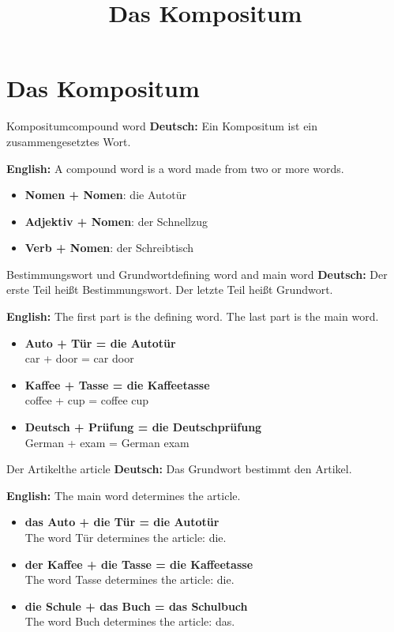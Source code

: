 \documentclass[a4paper,11pt]{article}
\title{Das Kompositum}
\date{}
\newcommand{\GermanText}[1]{\textbf{Deutsch: }#1\par}
\newcommand{\EnglishText}[1]{{\small\color{SoftGray}\textbf{English: }#1\par}}
\newcommand{\ExampleItem}[2]{\item \textbf{#1}\\{\small\color{SoftGray}#2}}
\begin{document}
    \maketitle
    \tableofcontents
    \newpage
    
    
    \section{Das Kompositum}
        
        \begin{grammarentry}{Kompositum}{compound word}
            \GermanText{Ein Kompositum ist ein zusammengesetztes Wort.}
            \EnglishText{A compound word is a word made from two or more words.}
            
            \begin{itemize}
                \item \textbf{Nomen + Nomen}: die Autotür
                \item \textbf{Adjektiv + Nomen}: der Schnellzug
                \item \textbf{Verb + Nomen}: der Schreibtisch
            \end{itemize}
        \end{grammarentry}
        
        \begin{grammarentry}{Bestimmungswort und Grundwort}{defining word and main word}
            \GermanText{Der erste Teil heißt Bestimmungswort. Der letzte Teil heißt Grundwort.}
            \EnglishText{The first part is the defining word. The last part is the main word.}
            
            \begin{exbox}
                \begin{itemize}
                    \ExampleItem{Auto + Tür = die Autotür}{car + door = car door}
                    \ExampleItem{Kaffee + Tasse = die Kaffeetasse}{coffee + cup = coffee cup}
                    \ExampleItem{Deutsch + Prüfung = die Deutschprüfung}{German + exam = German exam}
                \end{itemize}
            \end{exbox}
        \end{grammarentry}
        
        \begin{grammarentry}{Der Artikel}{the article}
            \GermanText{Das Grundwort bestimmt den Artikel.}
            \EnglishText{The main word determines the article.}
            
            \begin{exbox}
                \begin{itemize}
                    \ExampleItem{das Auto + die Tür = die Autotür}{The word Tür determines the article: die.}
                    \ExampleItem{der Kaffee + die Tasse = die Kaffeetasse}{The word Tasse determines the article: die.}
                    \ExampleItem{die Schule + das Buch = das Schulbuch}{The word Buch determines the article: das.}
                \end{itemize}
            \end{exbox}
        \end{grammarentry}
        
\end{document}
